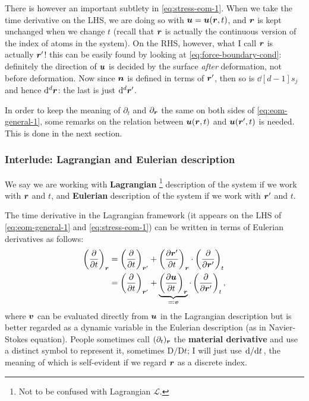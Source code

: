 \documentclass[hyperref, a4paper]{article}
\newcommand*{\concept}[1]{{\textbf{#1}}}
\begin{document}
There is however an important subtlety in \eqref{eq:stress-eom-1}.
When we take the time derivative on the LHS, 
we are doing so with $\vb*{u} = \vb*{u}(\vb*{r}, t)$,
and $\vb*{r}$ is kept unchanged when we change $t$
(recall that $\vb*{r}$ is actually the continuous version 
of the index of atoms in the system).
On the RHS, however, what I call $\vb*{r}$ is actually $\vb*{r}'$!
this can be easily found by looking at \eqref{eq:force-boundary-cond}:
definitely the direction of $\vb*{u}$ is decided 
by the surface \emph{after} deformation,
not before deformation.
Now since $\vb*{n}$ is defined in terms of $\vb*{r}'$,
then so is $\dd[d-1]{s_j}$ and hence $\dd[d]{\vb*{r}}$:
the last is just $\dd[d]{\vb*{r}'}$.

In order to keep the meaning of $\partial_t$ and $\partial_{\vb*{r}}$ the same 
on both sides of \eqref{eq:eom-general-1},
some remarks on the relation 
between $\vb*{u}(\vb*{r}, t)$ and $\vb*{u}(\vb*{r}', t)$ is needed.
This is done in the next section.

\subsubsection{Interlude: Lagrangian and Eulerian description}\label{sec:lagrangian-and-eulerian}

We say we are working with \concept{Lagrangian}%
\footnote{
    Not to be confused with Lagrangian $\mathcal{L}$.
}
description of the system if we work with $\vb*{r}$ and $t$,
and \concept{Eulerian} description of the system 
if we work with $\vb*{r}'$ and $t$.

The time derivative in the Lagrangian framework 
(it appears on the LHS of \eqref{eq:eom-general-1} and \eqref{eq:stress-eom-1})
can be written in terms of Eulerian derivatives as follows:
\begin{equation}
    \begin{aligned}
        \left(\pdv{t}\right)_{\vb*{r}} &= \left(\pdv{t}\right)_{\vb*{r}'} +
        \left(\pdv{\vb*{r}'}{t}\right)_{\vb*{r}} \cdot \left(\pdv{\vb*{r}'}\right)_t \\
        &= \left(\pdv{t}\right)_{\vb*{r}'} +
        \underbrace{\left(\pdv{\vb*{u}}{t}\right)_{\vb*{r}}}_{\eqqcolon \vb*{v}} \cdot \left(\pdv{\vb*{r}'}\right)_t,
    \end{aligned}
\end{equation}
where $\vb*{v}$ can be evaluated directly from $\vb*{u}$ in the Lagrangian description
but is better regarded as a dynamic variable in the Eulerian description 
(as in Navier-Stokes equation).
People sometimes call $(\partial_t)_{\vb*{r}}$ 
the \concept{material derivative} 
and use a distinct symbol to represent it,
sometimes $\mathrm{D}/\mathrm{D}t$;
I will just use $\dv*{t}$,
the meaning of which is self-evident if we regard $\vb*{r}$ as a discrete index.
\end{document}
